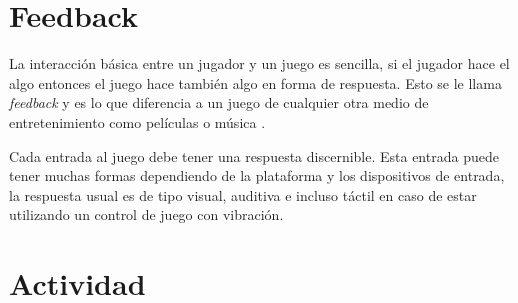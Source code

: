 \section{Feedback}
La interacción básica entre un jugador y un juego es sencilla, si el jugador hace el algo entonces el juego hace también algo en forma de respuesta. Esto se le llama \emph{feedback} y es lo que diferencia a un juego de cualquier otra medio de entretenimiento como películas o música \cite[p.~18]{bobbatesgamedesign}.

Cada entrada al juego debe tener una respuesta discernible. Esta entrada puede tener muchas formas dependiendo de la plataforma y los dispositivos de entrada, la respuesta usual es de tipo visual, auditiva e incluso táctil en caso de estar utilizando un control de juego con vibración.

\section{Actividad}
